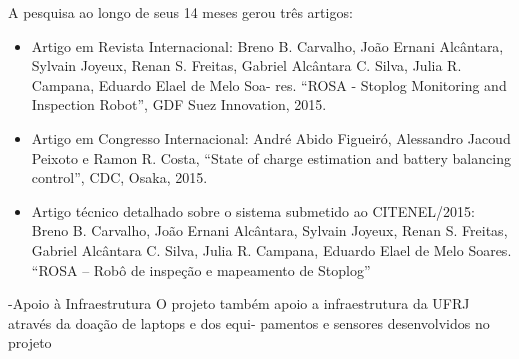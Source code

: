 A pesquisa ao longo de seus 14 meses gerou três artigos:
\begin{itemize}
\item Artigo em Revista Internacional: Breno B. Carvalho, João Ernani Alcântara,
Sylvain Joyeux, Renan S. Freitas, Gabriel Alcântara C. Silva, Julia R. Campana,
Eduardo Elael de Melo Soa- res. “ROSA - Stoplog Monitoring and Inspection
Robot”, GDF Suez Innovation, 2015.
\item Artigo em Congresso Internacional: André Abido Figueiró, Alessandro Jacoud
Peixoto e Ramon R. Costa, “State of charge estimation and battery balancing control”, CDC, Osaka, 2015.
\item Artigo técnico detalhado sobre o sistema submetido ao CITENEL/2015: Breno
B. Carvalho, João Ernani Alcântara, Sylvain Joyeux, Renan S. Freitas, Gabriel
Alcântara C. Silva, Julia R. Campana, Eduardo Elael de Melo Soares. “ROSA – Robô
de inspeção e mapeamento de Stoplog” 
\end{itemize}

-Apoio à Infraestrutura
O projeto também apoio a infraestrutura da UFRJ através da doação de laptops e dos equi-
pamentos e sensores desenvolvidos no projeto